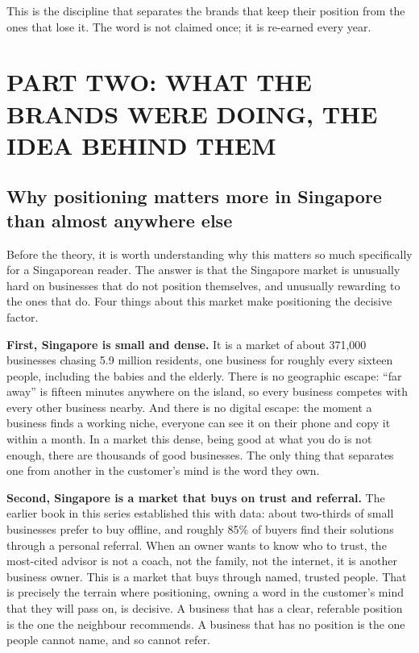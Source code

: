 \documentclass[10pt,twoside,openany]{memoir}
\begin{document}
This is the discipline that separates the brands that keep their
position from the ones that lose it. The word is not claimed once; it is
re-earned every year.

\part{PART TWO: WHAT THE BRANDS WERE DOING, THE IDEA BEHIND
THEM}\label{part-two-what-the-brands-were-doing-the-idea-behind-them}

\FloatBarrier
\chapter{Why positioning matters more in Singapore than almost anywhere
else}\label{why-positioning-matters-more-in-singapore-than-almost-anywhere-else}

Before the theory, it is worth understanding why this matters so much
specifically for a Singaporean reader. The answer is that the Singapore
market is unusually hard on businesses that do not position themselves,
and unusually rewarding to the ones that do. Four things about this
market make positioning the decisive factor.

\textbf{First, Singapore is small and dense.} It is a market of about
371,000 businesses chasing 5.9 million residents, one business for
roughly every sixteen people, including the babies and the elderly.
There is no geographic escape: ``far away'' is fifteen minutes anywhere
on the island, so every business competes with every other business
nearby. And there is no digital escape: the moment a business finds a
working niche, everyone can see it on their phone and copy it within a
month. In a market this dense, being good at what you do is not enough,
there are thousands of good businesses. The only thing that separates
one from another in the customer's mind is the word they own.

\textbf{Second, Singapore is a market that buys on trust and referral.}
The earlier book in this series established this with data: about
two-thirds of small businesses prefer to buy offline, and roughly 85\%
of buyers find their solutions through a personal referral. When an
owner wants to know who to trust, the most-cited advisor is not a coach,
not the family, not the internet, it is another business owner. This is
a market that buys through named, trusted people. That is precisely the
terrain where positioning, owning a word in the customer's mind that
they will pass on, is decisive. A business that has a clear, referable
position is the one the neighbour recommends. A business that has no
position is the one people cannot name, and so cannot refer.
\end{document}
